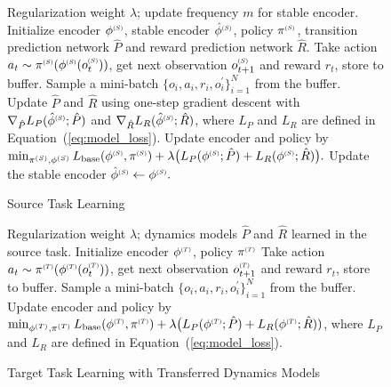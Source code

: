 \begin{figure}[t]
\vspace{-2em}
\begin{algorithm}[H]
\caption{Source Task Learning}
\label{alg:source}
\begin{algorithmic}[1] 
    \Require Regularization weight $\lambda$; update frequency $m$ for stable encoder.
    \State Initialize encoder $\phi\source$, stable encoder $\hat{\phi}\source$, policy $\pi\source$, transition prediction network $\hat{P}$ and reward prediction network $\hat{R}$.
        \State Take action $a_t \sim \pi\source(\phi\source(o\source_t))$, get next observation $o_{t+1}\source$ and reward $r_t$, store to buffer.
        \State Sample a mini-batch $\{o_i,a_i,r_i,o^\prime_i\}_{i=1}^N$ from the buffer.
        \State Update $\hat{P}$ and $\hat{R}$ using one-step gradient descent with $\nabla_{\hat{P}} L_P(\hat{\phi}\source;\hat{P})$ and $\nabla_{\hat{R}} L_R(\hat{\phi}\source;\hat{R})$, where $L_P$ and $L_R$ are defined in Equation~(\ref{eq:model_loss}).
        \State Update encoder and policy by $\min_{\pi\source,\phi\source} L_{\text{base}}(\phi\source, \pi\source) + \lambda \big(L_P(\phi\source;\hat{P}) + L_R(\phi\source;\hat{R})\big).$
          Update the stable encoder $\hat{\phi}\source \leftarrow \phi\source.$
        \EndIf
    \EndFor 
\end{algorithmic}
\end{algorithm}
\vspace{-1.5em}
\end{figure}
\begin{figure}[t]
\vspace{-2em}
\begin{algorithm}[H]
\caption{Target Task Learning with Transferred Dynamics Models}
\label{alg:target}
\begin{algorithmic}[1] 
    \Require Regularization weight $\lambda$; dynamics models $\hat{P}$ and $\hat{R}$ learned in the source task.
    \State Initialize encoder $\phi\target$, policy $\pi\target$
        \State Take action $a_t \sim \pi\target(\phi\target(o_t\target))$, get next observation $o_{t+1}\target$ and reward $r_t$, store to buffer.
        \State Sample a mini-batch $\{o_i,a_i,r_i,o^\prime_i\}_{i=1}^N$ from the buffer.
        \State Update encoder and policy by $\min_{\phi\target, \pi\target} L_{\text{base}}(\phi\target,\pi\target) + \lambda \big(L_P(\phi\target;\hat{P}) + L_R(\phi\target;\hat{R}))$, where $L_P$ and $L_R$ are defined in Equation~(\ref{eq:model_loss}).
    \EndFor 
\end{algorithmic}
\end{algorithm}
\vspace{-2em}
\end{figure}
\vspace{-0.5em}
